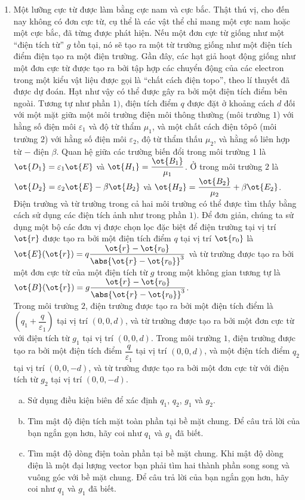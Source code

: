 \begin{vd}
\begin{enumerate}[1) ]
    \item Một lưỡng cực từ được làm bằng cực nam và cực bắc. Thật thú vị, cho đến nay không có đơn cực từ, cụ thể là các vật thể chỉ mang một cực nam hoặc một cực bắc, đã từng được phát hiện. Nếu một đơn cực từ giống như một ``điện tích từ'' $g$ tồn tại, nó sẽ tạo ra một từ trường giống như một điện tích điểm điện tạo ra một điện trường. Gần đây, các hạt giả hoạt động giống như một đơn cực từ được tạo ra bởi tập hợp các chuyển động của các electron trong một kiểu vật liệu được gọi là ``chất cách điện topo'', theo lí thuyết đã được dự đoán. Hạt như vậy có thể được gây ra bởi một điện tích điểm bên ngoài. Tương tự như phần $1)$, điện tích điểm $q$ được đặt ở khoảng cách $d$ đối với một mặt giữa một môi trường điện môi thông thường (môi trường $1$) với hằng số điện môi $\varepsilon_1$ và độ từ thẩm $\mu_1$, và một chất cách điện tôpô (môi trường $2$) với hằng số điện môi $\varepsilon_2$, độ từ thẩm thấu $\mu_2$, và hằng số liên hợp từ $-$ điện $\beta$. Quan hệ giữa các trường biến đổi trong môi trường $1$ là $\ot{D_1}=\varepsilon_1\ot{E}$ và $\ot{H_1}=\dfrac{\ot{B_1}}{\mu_1}$. Ở trong môi trường $2$ là $\ot{D_2}=\varepsilon_2\ot{E}-\beta\ot{B_2}$ và $\ot{H_2}=\dfrac{\ot{B_2}}{\mu_2}+\beta\ot{E_2}$.\\
    Điện trường và từ trường trong cả hai môi trường có thể được tìm thấy bằng cách sử dụng các điện tích ảnh như trong phần $1)$. Để đơn giản, chúng ta sử dụng một bộ các đơn vị được chọn lọc đặc biệt để điện trường tại vị trí $\ot{r}$ được tạo ra bởi một điện tích điểm $q$ tại vị trí $\ot{r_0}$ là $\ot{E}(\ot{r})=q\dfrac{\ot{r}-\ot{r_0}}{\abs{\ot{r}-\ot{r_0}}^3}$ và từ trường được tạo ra bởi một đơn cực từ của một điện tích từ $g$ trong một không gian tương tự là $\ot{B}(\ot{r})=g\dfrac{\ot{r}-\ot{r_0}}{\abs{\ot{r}-\ot{r_0}}^3}$.\\
    Trong môi trường $2$, điện trường được tạo ra bởi một điện tích điểm là $(q_1+\dfrac{q}{\varepsilon_1})$ tại vị trí $(0,0,d)$, và từ trường được tạo ra bởi một đơn cực từ với điện tích từ $g_1$ tại vị trí $(0,0,d)$. Trong môi trường $1$, điện trường được tạo ra bởi một điện tích điểm $\dfrac{q}{\varepsilon_1}$ tại vị trí $(0,0,d)$, và một điện tích điểm $q_2$ tại vị trí $(0,0,-d)$, và từ trường được tạo ra bởi một đơn cực từ với điện tích từ $g_2$ tại vị trí $(0,0,-d)$.
    \begin{enumerate}[a)]
        \item Sử dụng điều kiện biên để xác định $q_1$, $q_2$, $g_1$ và $g_2$.
        \item Tìm mật độ điện tích mặt toàn phần tại bề mặt chung. Để câu trả lời của bạn ngắn gọn hơn, hãy coi như $q_1$ và $g_1$ đã biết.
        \item Tìm mật độ dòng điện toàn phần tại bề mặt chung. Khi mật độ dòng điện là một đại lượng vector bạn phải tìm hai thành phần song song và vuông góc với bề mặt chung. Để câu trả lời của bạn ngắn gọn hơn, hãy coi như $q_1$ và $g_1$ đã biết.
    \end{enumerate}
\end{enumerate}
\end{vd}
